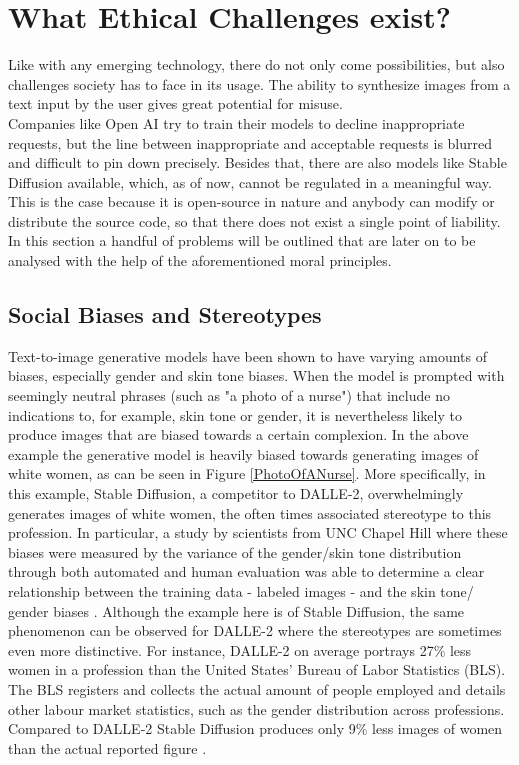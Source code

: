 \documentclass[10pt,twocolumn,twoside]{osajnl}
\begin{document}
\section{What Ethical Challenges exist?}
Like with any emerging technology, there do not only come possibilities, but also challenges society has to face in its usage.
The ability to synthesize images from a text input by the user gives great potential for misuse. \\
Companies like Open AI try to train their models to decline inappropriate requests, but the line between inappropriate and acceptable requests is blurred and difficult to pin down precisely. 
Besides that, there are also models like Stable Diffusion \cite{StableDiffusion} available, which, as of now, cannot be regulated in a meaningful way. 
This is the case because it is open-source in nature and anybody can modify or distribute the source code, so that there does not exist a single point of liability.
In this section a handful of problems will be outlined that are later on to be analysed with the help of the aforementioned moral principles.

\subsection{Social Biases and Stereotypes}
Text-to-image generative models have been shown to have varying amounts of biases, especially gender and skin tone biases. 
When the model is prompted with seemingly neutral phrases (such as "a photo of a nurse") that include no indications to, for example, skin tone or gender, it is nevertheless likely to produce images that are biased towards a certain complexion.
In the above example the generative model is heavily biased towards generating images of white women, as can be seen in Figure \ref{PhotoOfANurse}. 
More specifically, in this example, Stable Diffusion, a competitor to DALLE-2, overwhelmingly generates images of white women, the often times associated stereotype to this profession.
In particular, a study by scientists from UNC Chapel Hill where these biases were measured by the variance of the gender/skin tone distribution through both automated and human evaluation
was able to determine a clear relationship between the training data - labeled images - and the skin tone/ gender biases \cite{DallEval}. 
Although the example here is of Stable Diffusion, the same phenomenon can be observed for DALLE-2 \cite{DalleSocialBias} where the stereotypes are sometimes even more distinctive. 
For instance, DALLE-2 on average portrays 27\% less women in a profession than the United States' Bureau of Labor Statistics (BLS). The BLS registers and collects the actual 
amount of people employed and details other labour market statistics, such as the gender distribution across professions. Compared to DALLE-2 Stable Diffusion produces only 9\% less images of women than the actual 
reported figure \cite{stablebias}. 
\end{document}
